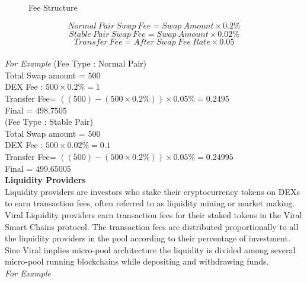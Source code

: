 \documentclass[10pt]{article}
\begin{document}
\begin{figure}[H]
\begin{center}
\caption{Fee Structure}
\end{center}
\end{figure}



\begin{equation}
Normal\:Pair\:Swap\:Fee=Swap\:Amount \times  0.2\%
\end{equation}
\begin{equation}
Stable\:Pair\:Swap\:Fee=Swap\:Amount \times  0.02\%
\end{equation}
\begin{equation}
Transfer\:Fee=After\:Swap\:Fee\:Rate \times  0.05%
\end{equation}\\

\textit{For Example} 
(Fee Type : Normal Pair) \\
Total Swap amount = $500$\\
DEX Fee : $500 \times  0.2\% = 1$ \\
Transfer Fee= $((500)-(500 \times  0.2\%)) \times  0.05\% = 0.2495$ \\
Final = $498.7505$\\

(Fee Type : Stable Pair) \\
Total Swap amount = $500$\\
DEX Fee : $500 \times  0.02\% = 0.1$ \\
Transfer Fee= $((500)-(500 \times  0.2\%)) \times  0.05\% = 0.24995$ \\
Final = $499.65005$\\
 
 
\textbf{Liquidity Providers}\\

Liquidity providers are investors who stake their cryptocurrency tokens on DEXs to earn transaction fees, often referred to as liquidity mining or market making. Viral Liquidity providers earn transaction fees for their staked tokens in the Viral Smart Chains protocol. The transaction fees are distributed proportionally to all the liquidity providers in the pool according to their percentage of investment. Sine Viral implies micro-pool architecture the liquidity is divided among several micro-pool running blockchains while depositing and withdrawing funds.\\


\textit{For Example}\\
\end{document}
